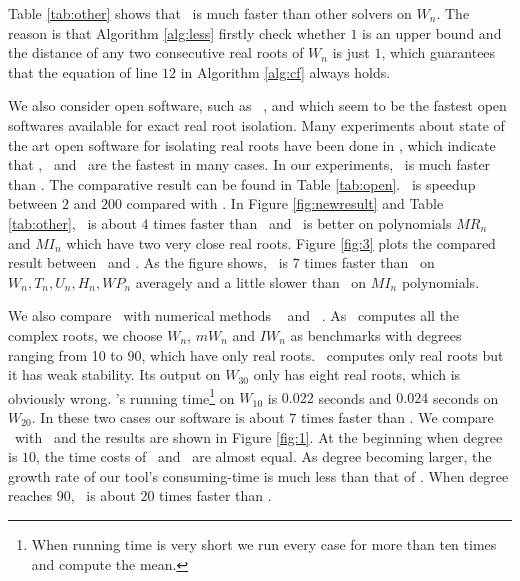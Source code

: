 Table \ref{tab:other} shows that \froot\ is much faster than other solvers on $W_n$. The reason is that Algorithm \ref{alg:less} firstly check whether $1$ is an upper bound and the distance of any two consecutive real roots of $W_n$ is just $1$, which guarantees that the equation of  line $12$ in Algorithm  \ref{alg:cf}  always holds.


 We also consider open software,  such as \cf\  \cite{hemmer09}, \AND\cite{Tsigaridas2016} and \SLV\cite{kobel2016computing}  which
 seem to be the fastest  open softwares  available for exact real root isolation. Many experiments  about  state of the art open software for isolating
 real roots have been done in \cite{hemmer09,Tsigaridas2016,kobel2016computing},  which  indicate that     \cf, \AND\ and \SLV\
 are  the fastest in many cases.
 In our experiments, \froot\ is much faster than \cf. %
 The comparative result can be found in
 Table \ref{tab:open}. \froot\ is speedup between $2$ and $200$ compared with \cf.  In Figure \ref{fig:newresult} and Table \ref{tab:other}, \froot\ is about $4$ times faster than \AND\ and \AND\ is better on polynomials $MR_n$ and $MI_n$ which have two very close real roots.  Figure \ref{fig:3} plots the  compared
 	result between \froot\ and \SLV. As the figure shows, \froot\  is $7$ times faster than  \SLV\ on $W_n,T_n,U_n,H_n,WP_n$ averagely and a little slower than \SLV\ on $MI_n$ polynomials.


  We also compare \froot\  with numerical methods  \eign\ \cite{eigsolev} and \sle\ \cite{hemmer09}. As \eign\ computes all the complex roots, we choose $W_n$, $mW_n$ and $IW_n$ as benchmarks with degrees ranging from 10 to 90, which have only real roots. \sle\ computes only real roots but it has weak stability. Its output on $W_{30}$ only has eight real roots, which is obviously wrong. \sle's running time\footnote{When  running time is very short we run every case for more than ten times and compute the mean.} on $W_{10}$ is $0.022$ seconds and
 $0.024$ seconds on $W_{20}$. In these two cases our software is about $7$ times faster than \sle. We compare \froot\ with  \eign\ and the results are  shown in Figure \ref{fig:1}.
 At the beginning when degree is $10$, the time costs of \froot\ and \eign\ are
 almost equal. As degree becoming larger, the growth rate of our tool's consuming-time is much less than that of  \eign.  When degree reaches $90$, \froot\ is about $20$ times faster than \eign.


